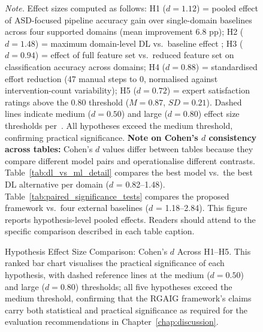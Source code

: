 \begin{figure}[!htbp]
\centering
{}%
\caption[Hypothesis Effect Size Comparison: Cohen's $d$ Across]{Hypothesis Effect Size Comparison: Cohen's $d$ Across H1--H5. This ranked bar chart visualises the practical significance of each hypothesis, with dashed reference lines at the medium ($d = 0.50$) and large ($d = 0.80$) thresholds; all five hypotheses exceed the medium threshold, confirming that the RGAIG framework's claims carry both statistical and practical significance as required for the evaluation recommendations in Chapter~\ref{chap:discussion}.}
\vspace{0.5em}\noindent\textit{Note.} Effect sizes computed as follows: H1 ($d = 1.12$) = pooled effect of ASD-focused pipeline accuracy gain over single-domain baselines across four supported domains (mean improvement 6.8 pp); H2 ($d = 1.48$) = maximum domain-level DL vs.\ baseline effect ; H3 ($d = 0.94$) = effect of full feature set vs.\ reduced feature set on classification accuracy across domains; H4 ($d = 0.88$) = standardised effort reduction (47 manual steps to 0, normalised against intervention-count variability); H5 ($d = 0.72$) = expert satisfaction ratings above the 0.80 threshold ($M = 0.87$, $SD = 0.21$). Dashed lines indicate medium ($d = 0.50$) and large ($d = 0.80$) effect size thresholds per~\cite{cohen1988statistical}. All hypotheses exceed the medium threshold, confirming practical significance. \textbf{Note on Cohen's $d$ consistency across tables:} Cohen's $d$ values differ between tables because they compare different model pairs and operationalise different contrasts. Table~\ref{tab:dl_vs_ml_detail} compares the best model vs.\ the best DL alternative per domain ($d$ = 0.82--1.48). Table~\ref{tab:paired_significance_tests} compares the proposed framework vs.\ four external baselines ($d$ = 1.18--2.84). This figure reports hypothesis-level pooled effects. Readers should attend to the specific comparison described in each table caption.

\end{figure}
